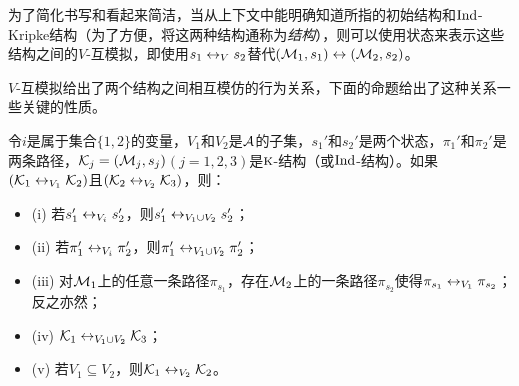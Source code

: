  为了简化书写和看起来简洁，当从上下文中能明确知道所指的初始结构和$\textrm{Ind}$-Kripke结构（为了方便，将这两种结构通称为\emph{结构}），则可以使用状态来表示这些结构之间的$V$-互模拟，即使用$s_1 \leftrightarrow_V s_2$替代$({\cal M}_1, s_1)\leftrightarrow ({\cal M}_2,s_2)$。
 
 $V$-互模拟给出了两个结构之间相互模仿的行为关系，下面的命题给出了这种关系一些关键的性质。
 \begin{proposition}\label{pro:div}
 	令$i$是属于集合$\{1,2\}$的变量，$V_1$和$V_2$是${\cal A}$的子集，$s_1'$和$s_2'$是两个状态，$\pi_1'$和$\pi_2'$是两条路径，${\cal K}_j=({\cal M}_j,s_j)$$(j=1,2,3)$是$\textsc{k}$-结构（或$\textrm{Ind}$-结构）。如果$({\cal K}_1 \leftrightarrow_{V_1} {\cal K}_2)$且$({\cal K}_2 \leftrightarrow_{V_2} {\cal K}_3)$，则：
 	\begin{itemize}
 		\item[] (i) 若$s_1' \leftrightarrow_{V_i} s_2'$，则$s_1'\leftrightarrow_{V_1 \cup V_2} s_2'$；
 		\item[] (ii) 若$\pi_1' \leftrightarrow_{V_i} \pi_2'$，则$\pi_1'\leftrightarrow_{V_1 \cup V_2} \pi_2'$；
 		\item[] (iii) 对${\cal M}_1$上的任意一条路径$\pi_{s_1}$，存在${\cal M}_2$上的一条路径$\pi_{s_2}$使得$\pi_{s_1} \leftrightarrow_{V_1} \pi_{s_2}$；反之亦然；
 		\item[] (iv) ${\cal K}_1 \leftrightarrow_{V_1 \cup V_2} {\cal K}_3$；
 		\item[] (v) 若$V_1 \subseteq V_2$，则${\cal K}_1 \leftrightarrow_{V_2} {\cal K}_2$。
 	\end{itemize}
 \end{proposition}
